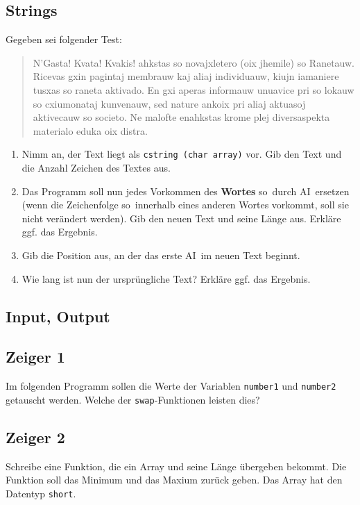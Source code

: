 \documentclass[11pt, a4paper]{article}
\begin{document}
\subsection{Strings}
Gegeben sei folgender Test:
\begin{quote}
	N'Gasta! Kvata! Kvakis! ahkstas so novajxletero (oix jhemile) so Ranetauw. Ricevas gxin pagintaj membrauw kaj aliaj individuauw, kiujn iamaniere tusxas so raneta aktivado. En gxi aperas informauw unuavice pri so lokauw so cxiumonataj kunvenauw, sed nature ankoix pri aliaj aktuasoj aktivecauw so societo. Ne malofte enahkstas krome plej diversaspekta materialo eduka oix distra.
\end{quote}
\begin{enumerate}
	\item Nimm an, der Text liegt als \texttt{cstring (char array)} vor. Gib den Text und die Anzahl Zeichen des Textes aus.
	\item Das Programm soll nun jedes Vorkommen des \textbf{Wortes} \glqq so\grqq\ durch \glqq AI\grqq\ ersetzen (wenn die Zeichenfolge \glqq so\grqq\ innerhalb eines anderen Wortes vorkommt, soll sie nicht verändert werden). Gib den neuen Text und seine Länge aus. Erkläre ggf. das Ergebnis.
	\item Gib die Position aus, an der das erste \glqq AI\grqq\ im neuen Text beginnt.
	\item Wie lang ist nun der ursprüngliche Text? Erkläre ggf. das Ergebnis.
\end{enumerate}

\subsection{Input, Output}

\subsection{Zeiger 1}
Im folgenden Programm sollen die Werte der Variablen \texttt{number1} und \texttt{number2} getauscht werden. Welche der \texttt{swap}-Funktionen leisten dies?


\subsection{Zeiger 2}
\label{zeigerAufgabe}
Schreibe eine Funktion, die ein Array und seine Länge übergeben bekommt. Die Funktion soll das Minimum und das Maxium zurück geben. Das Array hat den Datentyp \texttt{short}.
\end{document}
